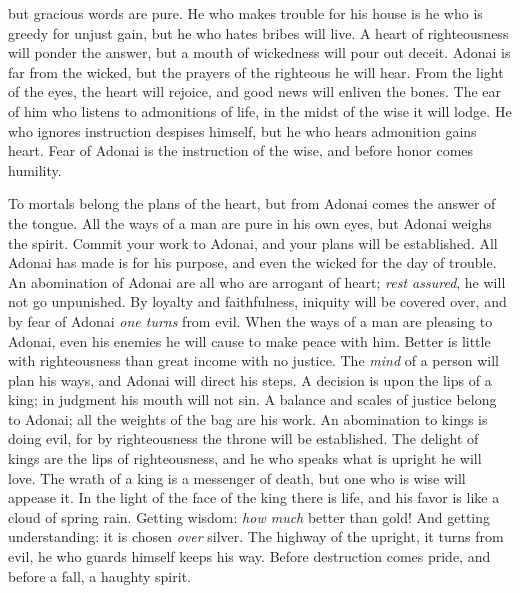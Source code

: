 \begin{biblechapter}
but gracious words are pure.
\verse He who makes trouble for his house is he who is greedy for unjust gain, 
but he who hates bribes will live.
\verse A heart of righteousness will ponder the answer, 
but a mouth of wickedness will pour out deceit.
\verse Adonai is far from the wicked, 
but the prayers of the righteous he will hear.
\verse From the light of the eyes, the heart will rejoice, 
and good news will enliven the bones.
\verse The ear of him who listens to admonitions of life, 
in the midst of the wise it will lodge.
\verse He who ignores instruction despises himself, 
but he who hears admonition gains heart.
\verse Fear of Adonai is the instruction of the wise, 
and before honor comes humility.
\end{biblechapter}

\begin{biblechapter} %
\verse To mortals belong the plans of the heart, 
but from Adonai comes the answer of the tongue.
\verse All the ways of a man are pure in his own eyes, 
but Adonai weighs the spirit.
\verse Commit your work to Adonai, 
and your plans will be established.
\verse All Adonai has made is for his purpose, 
and even the wicked for the day of trouble.
\verse An abomination of Adonai are all who are arrogant of heart; 
\textit{rest assured}, he will not go unpunished.
\verse By loyalty and faithfulness, iniquity will be covered over, 
and by fear of Adonai \textit{one turns} from evil.
\verse When the ways of a man are pleasing to Adonai, 
even his enemies he will cause to make peace with him.
\verse Better is little with righteousness 
than great income with no justice.
\verse The \textit{mind} of a person will plan his ways, 
and Adonai will direct his steps.
\verse A decision is upon the lips of a king; 
in judgment his mouth will not sin.
\verse A balance and scales of justice belong to Adonai; 
all the weights of the bag are his work.
\verse An abomination to kings is doing evil, 
for by righteousness the throne will be established.
\verse The delight of kings are the lips of righteousness, 
and he who speaks what is upright he will love.
\verse The wrath of a king is a messenger of death, 
but one who is wise will appease it.
\verse In the light of the face of the king there is life, 
and his favor is like a cloud of spring rain.
\verse Getting wisdom: \textit{how much} better than gold! 
And getting understanding: it is chosen \textit{over} silver.
\verse The highway of the upright, it turns from evil, 
he who guards himself keeps his way.
\verse Before destruction comes pride, 
and before a fall, a haughty spirit.

\end{biblechapter}
